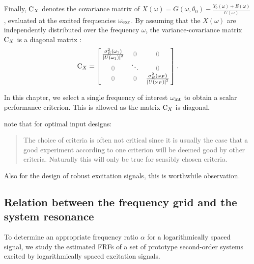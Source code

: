   Finally, $\mathrm{C}_{X}$ denotes the covariance matrix of $X\left(\omega\right) = G\left(\omega, \theta_0 \right) - \frac{Y_0\left(\omega \right) + E\left( \omega \right)  }{ U\left( \omega \right) } $, evaluated at the excited frequencies $\omega_{\mathrm{exc}}$.
  By assuming that the $X\left( \omega \right) $ are independently distributed over the frequency $\omega$, the variance-covariance matrix $\mathrm{C}_{X}$ is a diagonal matrix \citep{Pintelon2012}:
  \begin{equation}
    \C_{X} =
               \left[ \left.
               \begin{matrix}
                 \frac{\sigma^2_E\left(\omega_1 \right) }
                      {\abs{ U\left(\omega_1 \right)}^2 } & \deemph{0} & \deemph{0}\\
                 \deemph{0} & \ddots & \deemph{0} \\
                 \deemph{0} & \deemph{0} & \frac{\sigma^2_E\left(\omega_F \right) }
                              {\abs{U\left(\omega_F \right)}^2 }
               \end{matrix}
               \right.^{\vphantom{x}}\right]
    \text{.}
  \end{equation}

  In this chapter, we select a single frequency of interest $\omega_{\mathrm{int}}$ to obtain a scalar performance criterion.
  This is allowed as the matrix $\mathrm{C}_{X}$ is diagonal.

\begin{remark}
\citet{Goodwin1977} note that for optimal input designs:
\begin{quote}
The choice of criteria is often not critical since it is usually the case that a good experiment according to one criterion will be deemed good by other criteria. 
Naturally this will only be true for sensibly chosen criteria.
\end{quote}
Also for the design of robust excitation signals, this is worthwhile observation.
\end{remark}

  \subsection{Relation between the frequency grid and the system resonance} 
  \label{sec:excitation:relationLogGridSystem}
  To determine an appropriate frequency ratio $\alpha$ for a logarithmically spaced signal, we study the estimated \glspl{FRF} of a set of prototype second-order systems excited by logarithmically spaced excitation signals.

